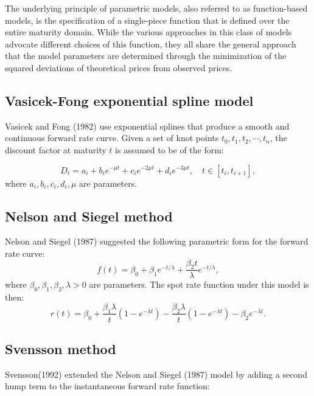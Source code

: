 The underlying principle of parametric models, also referred to as
function-based models, is the specification of a single-piece function that 
is defined over the entire maturity domain. While the various approaches 
in this class of models advocate different choices of this function, they 
all share the general approach that the model parameters are determined 
through the minimization of the squared deviations of theoretical prices 
from observed prices.

\subsection{Vasicek-Fong exponential spline model}
Vasicek and Fong (1982) use exponential splines that produce a smooth and
continuous forward rate curve. Given a set of knot points 
$t_0, t_1,t_2,\cdots,t_n$, the discount factor at maturity $t$ is assumed to be
of the form:

\begin{equation}
  D_t = a_i + b_i e^{-\mu t} + c_i e^{-2\mu t} + d_i e^{-3\mu t}, 
        \quad t\in[t_i,t_{i+1}],
\end{equation}
where $a_i,b_i,c_i,d_i,\mu$ are parameters.


\subsection{Nelson and Siegel method}
Nelson and Siegel (1987) suggested the following parametric form for the forward
rate curve:
\begin{equation}
  f(t) = \beta_0 + \beta_1 e^{-t/\lambda} 
         + \frac{\beta_2 t}{\lambda} e^{-t/\lambda},
\end{equation}
where $\beta_0,\beta_1,\beta_2,\lambda>0$ are parameters. The spot rate function
under this model is then:
\begin{equation}
  r(t) = \beta_0 + \frac{\beta_1 \lambda}{t} \left(1- e^{-\lambda t} \right)
         - \frac{\beta_2 \lambda}{t} \left(1- e^{-\lambda t} \right)
         - \beta_2 e^{-\lambda t}.
\end{equation}

\subsection{Svensson method}
Svensson(1992) extended the Nelson and Siegel (1987) model by adding a second
hump term to the instantaneous forward rate function:

